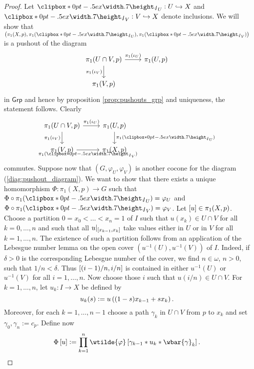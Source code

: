 \begin{proof}
	Let $\jota_U : U \hookrightarrow X$ and $\jota_V : V \hookrightarrow X$ denote inclusions. We will show that $\del[1]{\pi_1(X,p), \pi_1(\jota_U),\pi_1(\jota_V)}$ is a pushout of the diagram
	\begin{equation}
		\begin{tikzcd}
			\pi_1(U \cap V,p) \arrow[r,"\pi_1(\iota_U)"]\arrow[d,"\pi_1(\iota_V)"'] & \pi_1(U,p)\\
			\pi_1(V,p)
		\end{tikzcd}
		\label{diag:pushout_diagram}
	\end{equation}
	\noindent in $\mathsf{Grp}$ and hence by proposition \ref{prop:pushouts_grp} and uniqueness, the statement follows. Clearly
	\begin{equation*}
		\begin{tikzcd}
			\pi_1(U \cap V,p) \arrow[r,"\pi_1(\iota_U)"]\arrow[d,"\pi_1(\iota_V)"'] & \pi_1(U,p)\arrow[d,"\pi_1(\jota_U)"]\\
			\pi_1(V,p) \arrow[r,"\pi_1(\jota_V)"'] & \pi_1(X,p)
		\end{tikzcd}
	\end{equation*}
	\noindent commutes. Suppose now that $(G,\varphi_U,\varphi_V)$ is another cocone for the diagram (\ref{diag:pushout_diagram}). We want to show that there exists a unique homomorphism $\Phi : \pi_1(X,p) \to G$ such that $\Phi \circ \pi_1(\jota_U) = \varphi_U$ and $\Phi \circ \pi_1(\jota_V) = \varphi_V$. Let $\sbr{u} \in \pi_1(X,p)$. Choose a partition $0 = x_0 < \dots < x_n = 1$ of $I$ such that $u(x_k) \in U \cap V$ for all $k = 0,\dots,n$ and such that all $u\vert_{\sbr[0]{x_{k - 1},x_k}}$ take values either in $U$ or in $V$ for all $k = 1,\dots, n$. The existence of such a partition follows from an application of the Lebesgue number lemma on the open cover $(u^{-1}(U),u^{-1}(V))$ of $I$. Indeed, if $\delta > 0$ is the corresponding Lebesgue number of the cover, we find $n \in \omega$, $n > 0$, such that $1/n < \delta$. Thus $\intcc[0]{(i-1)/n,
	i/n}$ is contained in either $u^{-1}(U)$ or $u^{-1}(V)$ for all $i = 1,\dots,n$. Now choose those $i$ such that $u(i/n) \in U \cap V$. For $k = 1,\dots,n$, let $u_k : I \to X$ be defined by
	\begin{equation*}
		u_k(s) := u\del[0]{(1 - s)x_{k - 1} + sx_k}.
	\end{equation*}
	Moreover, for each $k = 1,\dots,n-1$ choose a path $\gamma_k$ in $U \cap V$ from $p$ to $x_k$ and set $\gamma_0, \gamma_n := c_p$. Define now
	\begin{equation}
		\Phi\sbr{u} := \prod_{k = 1}^n \wtilde{\varphi} \sbr[0]{\gamma_{k - 1} \ast u_k \ast \wbar{\gamma}_k}.
		\label{eq:Phi}
	\end{equation}

\end{proof}
